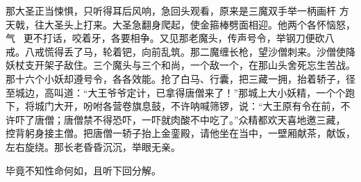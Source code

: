 那大圣正当悚惧，只听得耳后风响，急回头观看，原来是三魔双手举一柄画杆
方天戟，往大圣头上打来。大圣急翻身爬起，使金箍棒劈面相迎。他两个各怀恼怒，
气，更不打话，咬着牙，各要相争。又见那老魔头，传声号令，举钢刀便砍八
戒。八戒慌得丢了马，轮着钯，向前乱筑。那二魔缠长枪，望沙僧刺来。沙僧使降
妖杖支开架子敌住。三个魔头与三个和尚，一个敌一个，在那山头舍死忘生苦战。
那十六个小妖却遵号令，各各效能。抢了白马、行囊，把三藏一拥，抬着轿子，径
至城边，高叫道：“大王爷爷定计，已拿得唐僧来了！”那城上大小妖精，一个个跑
下，将城门大开，吩咐各营卷旗息鼓，不许呐喊筛锣，说：“大王原有令在前，不
许吓了唐僧；唐僧禁不得恐吓，一吓就肉酸不中吃了。”众精都欢天喜地邀三藏，
控背躬身接主僧。把唐僧一轿子抬上金銮殿，请他坐在当中，一壁厢献茶，献饭，
左右旋绕。那长老昏昏沉沉，举眼无亲。

毕竟不知性命何如，且听下回分解。